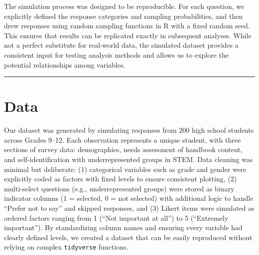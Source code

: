 \documentclass[
  letterpaper,
  DIV=11,
  numbers=noendperiod]{scrartcl}
\begin{document}
The simulation process was designed to be reproducible. For each
question, we explicitly defined the response categories and sampling
probabilities, and then drew responses using random sampling functions
in R with a fixed random seed. This ensures that results can be
replicated exactly in subsequent analyses. While not a perfect
substitute for real-world data, the simulated dataset provides a
consistent input for testing analysis methods and allows us to explore
the potential relationships among variables.

\begin{center}\rule{0.5\linewidth}{0.5pt}\end{center}

\section{Data}\label{data}

Our dataset was generated by simulating responses from 200 high school
students across Grades 9--12. Each observation represents a unique
student, with three sections of survey data: demographics, needs
assessment of handbook content, and self-identification with
underrepresented groups in STEM. Data cleaning was minimal but
deliberate: (1) categorical variables such as grade and gender were
explicitly coded as factors with fixed levels to ensure consistent
plotting, (2) multi-select questions (e.g., underrepresented groups)
were stored as binary indicator columns (1 = selected, 0 = not selected)
with additional logic to handle ``Prefer not to say'' and skipped
responses, and (3) Likert items were simulated as ordered factors
ranging from 1 (``Not important at all'') to 5 (``Extremely
important''). By standardizing column names and ensuring every variable
had clearly defined levels, we created a dataset that can be easily
reproduced without relying on complex \texttt{tidyverse} functions.
\end{document}
